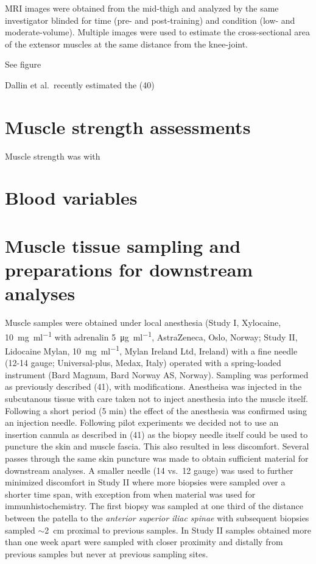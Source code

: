 \documentclass[twoside,10pt]{gihclass} %
\begin{document}
MRI images were obtained from the mid-thigh and analyzed by the same investigator blinded for time (pre- and post-training) and condition (low- and moderate-volume). Multiple images were used to estimate the cross-sectional area of the extensor muscles at the same distance from the knee-joint.

See figure

Dallin et al.~recently estimated the (40)

\hypertarget{muscle-strength-assessments}{%
\section{Muscle strength assessments}\label{muscle-strength-assessments}}

Muscle strength was with

\hypertarget{blood-variables}{%
\section{Blood variables}\label{blood-variables}}

\hypertarget{muscle-tissue-sampling-and-preparations-for-downstream-analyses}{%
\section{Muscle tissue sampling and preparations for downstream analyses}\label{muscle-tissue-sampling-and-preparations-for-downstream-analyses}}

Muscle samples were obtained under local anesthesia (Study I, Xylocaine, \SI{10}{\mg\per\ml} with adrenalin \SI{5}{\micro\gram\per\ml}, AstraZeneca, Oslo, Norway; Study II, Lidocaine Mylan, \SI{10}{\mg\per\ml}, Mylan Ireland Ltd, Ireland) with a fine needle (12-14 gauge; Universal-plus, Medax, Italy) operated with a spring-loaded instrument (Bard Magnum, Bard Norway AS, Norway). Sampling was performed as previously described
(41),
with modifications. Anestheisa was injected in the subcutanous tissue with care taken not to inject anesthesia into the muscle itself. Following a short period (5 min) the effect of the anesthesia was confirmed using an injection needle. Following pilot experiments we decided not to use an insertion cannula as described in (41) as the biopsy needle itself could be used to puncture the skin and muscle fascia. This also resulted in less discomfort. Several passes through the same skin puncture was made to obtain sufficient material for downstream analyses. A smaller needle (14 vs.~12 gauge) was used to further minimized discomfort in Study II where more biopsies were sampled over a shorter time span, with exception from when material was used for immunhistochemistry. The first biopsy was sampled at one third of the distance between the patella to the \emph{anterior superior iliac spinae} with subsequent biopsies sampled \(\sim\)\SI{2}{cm} proximal to previous samples. In Study II samples obtained more than one week apart were sampled with closer proximity and distally from previous samples but never at previous sampling sites.
\end{document}
